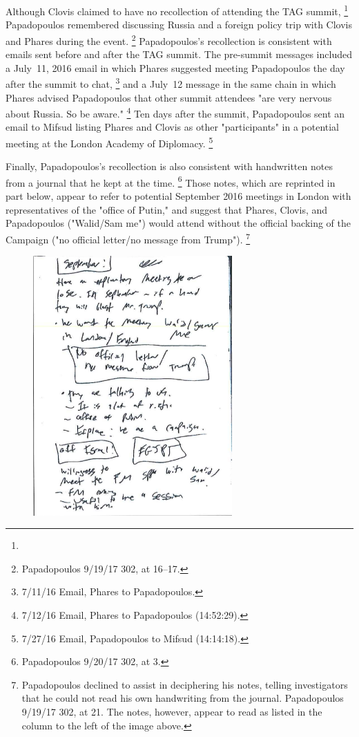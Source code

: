 Although Clovis claimed to have no recollection of attending the TAG summit,%
\footnote{}
Papadopoulos remembered discussing Russia and a foreign policy trip with Clovis and Phares during the event.%
\footnote{Papadopoulos 9/19/17 302, at 16--17.}
Papadopoulos's recollection is consistent with emails sent before and after the TAG summit.
The pre-summit messages included a July~11, 2016 email in which Phares suggested meeting Papadopoulos the day after the summit to chat,%
\footnote{7/11/16 Email, Phares to Papadopoulos.}
and a July~12 message in the same chain in which Phares advised Papadopoulos that other summit attendees "are very nervous about Russia. So be aware."%
\footnote{7/12/16 Email, Phares to Papadopoulos (14:52:29).}
Ten days after the summit, Papadopoulos sent an email to Mifsud listing Phares and Clovis as other "participants" in a potential meeting at the London Academy of Diplomacy.%
\footnote{7/27/16 Email, Papadopoulos to Mifsud (14:14:18).}

Finally, Papadopoulos's recollection is also consistent with handwritten notes from a journal that he kept at the time.%
\footnote{Papadopoulos 9/20/17 302, at 3.}
Those notes, which are reprinted in part below, appear to refer to potential September 2016 meetings in London with representatives of the "office of Putin," and suggest that Phares, Clovis, and Papadopoulos ("Walid/Sam me") would attend without the official backing of the Campaign ("no official letter/no message from Trump").%
\footnote{Papadopoulos declined to assist in deciphering his notes, telling investigators that he could not read his own handwriting from the journal.
Papadopoulos 9/19/17 302, at 21.
The notes, however, appear to read as listed in the column to the left of the image above.}

\begin{figure}
    \vspace{-20pt}
    \begin{center}
        \includegraphics[width=3in]{images/p-92-papadopolous-notes.png}%
    \end{center}
    \vspace{-20pt}
    \caption*{}
    \vspace{-10pt}
    \label{fig:papadopolous-notes}
\end{figure}

